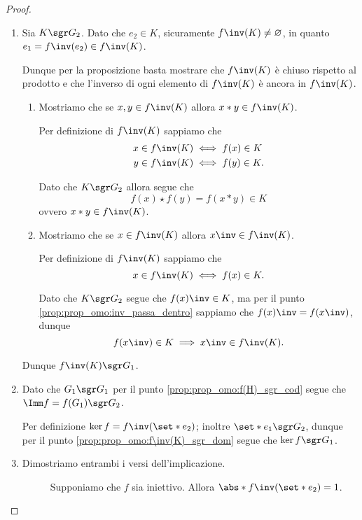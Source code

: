 \begin{proof}
\begin{enumerate}[label={(\roman*)}]
\begin{enumerate}[label={(\arabic*)}]
            Per definizione di $f(H)$ dovrà esistere $h \in H$ tale che $x = f(h)$. Dato che $H \sgr G_1$ allora $h\inv \in H$.

            Dunque $f(h\inv) \in f(H)$, ma per il punto \ref{prop:prop_omo:inv_passa_dentro} sappiamo che \[
                f(h\inv) = f(h)\inv = x\inv \in f(H).   
            \]
        \end{enumerate}
        Dunque $f(H) \sgr G_2$.
        \item Sia $K \sgr G_2$. Dato che $e_2 \in K$, sicuramente $f\inv(K) \neq \varnothing$, in quanto $e_1 = f\inv(e_2) \in f\inv(K)$.
        
        Dunque per la proposizione  basta mostrare che $f\inv(K)$ è chiuso rispetto al prodotto e che l'inverso di ogni elemento di $f\inv(K)$ è ancora in $f\inv(K)$.

        \begin{enumerate}[label={(\arabic*)}]
            \item Mostriamo che se $x, y \in f\inv(K)$ allora $x* y \in f\inv(K)$.
            
            Per definizione di $f\inv(K)$ sappiamo che \begin{align*}
                x \in f\inv(K) &\iff f(x) \in K \\
                y \in f\inv(K) &\iff f(y) \in K.
            \end{align*}
            
            Dato che $K \sgr G_2$ allora segue che \[
                f(x) \star f(y) = f(x * y) \in K     
            \] ovvero $x * y \in f\inv(K)$.
            \item Mostriamo che se $x \in f\inv(K)$ allora $x\inv \in f\inv(K)$.
            
            Per definizione di $f\inv(K)$ sappiamo che \[
                x \in f\inv(K) \iff f(x) \in K.    
            \] 
            
            Dato che $K \sgr G_2$ segue che $f(x)\inv \in K$, ma per il punto \ref{prop:prop_omo:inv_passa_dentro} sappiamo che $f(x)\inv = f(x\inv)$, dunque \[
                f(x\inv) \in K \implies x\inv \in f\inv(K).  
            \]
        \end{enumerate}
        Dunque $f\inv(K) \sgr G_1$.
        \item Dato che $G_1 \sgr G_1$ per il punto \ref{prop:prop_omo:f(H)_sgr_cod} segue che $\Imm f = f(G_1) \sgr G_2$.
        
        Per definizione $\ker f = f\inv(\set*{e_2})$; inoltre $\set*{e_1} \sgr G_2$, dunque per il punto \ref{prop:prop_omo:f\inv(K)_sgr_dom} segue che $\ker f \sgr G_1$.
        \item Dimostriamo entrambi i versi dell'implicazione.
        \begin{description}
            \item[\boximpl ] Supponiamo che $f$ sia iniettivo. Allora $\abs*{f\inv(\set*{e_2})} = 1$.
            

\end{description}
\end{enumerate}
\end{proof}

